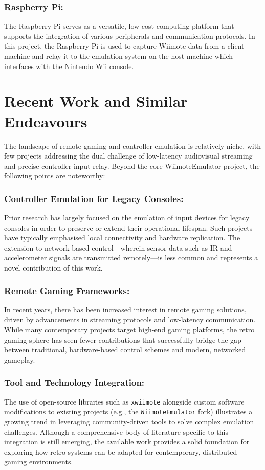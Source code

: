 \subsubsection{Raspberry Pi:} The Raspberry Pi serves as a versatile, low-cost computing platform that supports the integration of various peripherals and communication protocols. In this project, the Raspberry Pi is used to capture Wiimote data from a client machine and relay it to the emulation system on the host machine which interfaces with the Nintendo Wii console.


\section{Recent Work and Similar Endeavours}

The landscape of remote gaming and controller emulation is relatively niche, with few projects addressing the dual challenge of low-latency audiovisual streaming and precise controller input relay. Beyond the core WiimoteEmulator project, the following points are noteworthy:

\subsubsection{Controller Emulation for Legacy Consoles:} Prior research has largely focused on the emulation of input devices for legacy consoles in order to preserve or extend their operational lifespan. Such projects have typically emphasised local connectivity and hardware replication. The extension to network-based control—wherein sensor data such as IR and accelerometer signals are transmitted remotely—is less common and represents a novel contribution of this work.

\subsubsection{Remote Gaming Frameworks:} In recent years, there has been increased interest in remote gaming solutions, driven by advancements in streaming protocols and low-latency communication. While many contemporary projects target high-end gaming platforms, the retro gaming sphere has seen fewer contributions that successfully bridge the gap between traditional, hardware-based control schemes and modern, networked gameplay.

\subsubsection{Tool and Technology Integration:} The use of open-source libraries such as \texttt{xwiimote} alongside custom software modifications to existing projects (e.g., the \texttt{WiimoteEmulator} fork) illustrates a growing trend in leveraging community-driven tools to solve complex emulation challenges. Although a comprehensive body of literature specific to this integration is still emerging, the available work provides a solid foundation for exploring how retro systems can be adapted for contemporary, distributed gaming environments.

